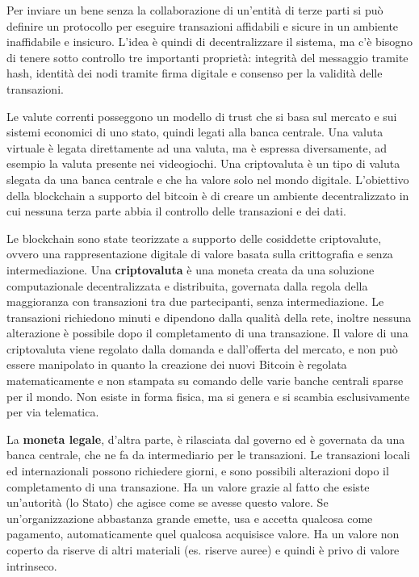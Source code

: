 \vspace{5mm}
Per inviare un bene senza la collaborazione di un'entità di terze parti si può definire un protocollo per eseguire transazioni affidabili e sicure in un ambiente inaffidabile e insicuro. L'idea è quindi di decentralizzare il sistema, ma c'è bisogno di tenere sotto controllo tre importanti proprietà: integrità del messaggio tramite hash, identità dei nodi tramite firma digitale e consenso per la validità delle transazioni.

Le valute correnti posseggono un modello di trust che si basa sul mercato e sui sistemi economici di uno stato, quindi legati alla banca centrale. Una valuta virtuale è legata direttamente ad una valuta, ma è espressa diversamente, ad esempio la valuta presente nei videogiochi. Una criptovaluta è un tipo di valuta slegata da una banca centrale e che ha valore solo nel mondo digitale. L'obiettivo della blockchain a supporto del bitcoin è di creare un ambiente decentralizzato in cui nessuna terza parte abbia il controllo delle transazioni e dei dati.

\vspace{5mm}

Le blockchain sono state teorizzate a supporto delle cosiddette criptovalute, ovvero una rappresentazione digitale di valore basata sulla crittografia e senza intermediazione. Una \textbf{criptovaluta} è una moneta creata da una soluzione computazionale decentralizzata e distribuita, governata dalla regola della maggioranza con transazioni tra due partecipanti, senza intermediazione. Le transazioni richiedono minuti e dipendono dalla qualità della rete, inoltre nessuna alterazione è possibile dopo il completamento di una transazione. Il valore di una criptovaluta viene regolato dalla domanda e dall'offerta del mercato, e non può essere manipolato in quanto la creazione dei nuovi Bitcoin è regolata matematicamente e non stampata su comando delle varie banche centrali sparse per il mondo. Non esiste in forma fisica, ma si genera e si scambia esclusivamente per via telematica.

La \textbf{moneta legale}, d'altra parte, è rilasciata dal governo ed è governata da una banca centrale, che ne fa da intermediario per le transazioni. Le transazioni locali ed internazionali possono richiedere giorni, e sono possibili alterazioni dopo il completamento di una transazione. Ha un valore grazie al fatto che esiste un'autorità (lo Stato) che agisce come se avesse questo valore. Se un'organizzazione abbastanza grande emette, usa e accetta qualcosa come pagamento, automaticamente quel qualcosa acquisisce valore. Ha un valore non coperto da riserve di altri materiali (es. riserve auree) e quindi è privo di valore intrinseco.

